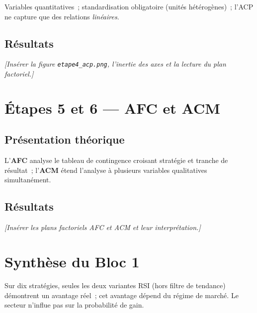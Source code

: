 \begin{conditions}
Variables quantitatives~; standardisation obligatoire (unités
hétérogènes)~; l'ACP ne capture que des relations \emph{linéaires}.
\end{conditions}

\subsection{Résultats}
\emph{[Insérer la figure \texttt{etape4\_acp.png}, l'inertie des axes et
la lecture du plan factoriel.]}

\section{Étapes 5 et 6 --- AFC et ACM}
\label{sec:b1-etape56}

\subsection{Présentation théorique}
L'\textbf{AFC} analyse le tableau de contingence croisant stratégie et
tranche de résultat~; l'\textbf{ACM} étend l'analyse à plusieurs
variables qualitatives simultanément.

\subsection{Résultats}
\emph{[Insérer les plans factoriels AFC et ACM et leur interprétation.]}

\section{Synthèse du Bloc 1}
\label{sec:b1-synthese}
Sur dix stratégies, seules les deux variantes RSI (hors filtre de
tendance) démontrent un avantage réel~; cet avantage dépend du régime de
marché. Le secteur n'influe pas sur la probabilité de gain.
